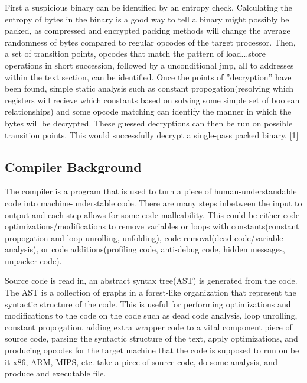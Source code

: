 \documentclass{article}
\begin{document}
\newline
First a suspicious binary can be identified by an entropy check. Calculating the entropy of bytes in the binary is a good way to tell a binary might possibly be packed, as compressed and encrypted packing methods will change the average randomness of bytes compared to regular opcodes of the target processor. Then, a set of transition points, opcodes that match the pattern of load...store operations in short succession, followed by a unconditional jmp, all to addresses within the text section, can be identified. Once the points of ''decryption'' have been found, simple static analysis such as constant propogation(resolving which registers will recieve which constants based on solving some simple set of boolean relationships) and some opcode matching can identify the manner in which the bytes will be decrypted. These guessed decryptions can then be run on possible transition points. This would successfully decrypt a single-pass packed binary. [1]

\newline

\subsection{Compiler Background}
The compiler is a program that is used to turn a piece of human-understandable code into machine-understable code. There are many steps inbetween the input to output and each step allows for some code malleability. This could be either code optimizations/modifications to remove variables or loops with constants(constant propogation and loop unrolling, unfolding), code removal(dead code/variable analysis), or code additions(profiling code, anti-debug code, hidden messages,  unpacker code). 

Source code is read in, an abstract syntax tree(AST) is generated from the code. The AST is a collection of graphs in a forest-like organization that represent the syntactic structure of the code. This is useful for performing optimizations and modifications to the code on the code such as dead code analysis, loop unrolling, constant propogation, adding extra wrapper code to a vital component piece of source code, parsing the syntactic structure of the text, apply optimizations, and producing opcodes for the target machine that the code is supposed to run on be it x86, ARM, MIPS, etc. take a piece of source code, do some analysis, and produce and executable file. 

\newpage
\end{document}

